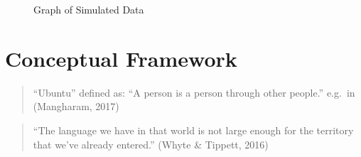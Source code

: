 \documentclass[
  letterpaper,
  DIV=11,
  numbers=noendperiod]{scrreprt}
\begin{document}
\begin{figure}


\caption{\label{fig-data}Graph of Simulated Data}

\end{figure}%


\chapter{Conceptual Framework}\label{sec-conceptualframework}

\begin{quote}
``Ubuntu'' defined as: ``A person is a person through other people.''
e.g.~in (Mangharam, 2017)
\end{quote}

\begin{quote}
``The language we have in that world is not large enough for the
territory that we've already entered.'' (Whyte \& Tippett, 2016)
\end{quote}
\end{document}
